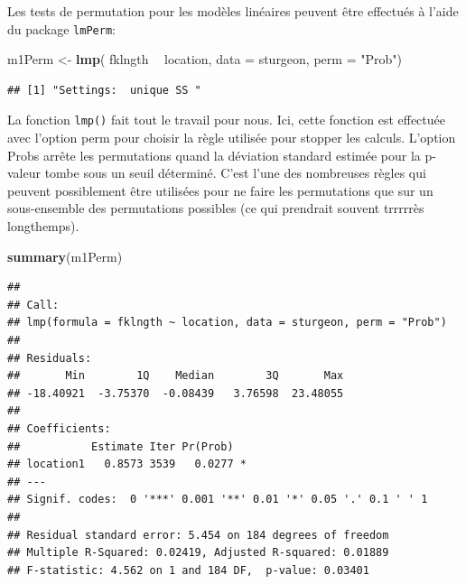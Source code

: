 \documentclass[12pt,]{book}
\newenvironment{Shaded}{\begin{snugshade}}{\end{snugshade}}
\newcommand{\DataTypeTok}[1]{\textcolor[rgb]{0.27,0.27,0.27}{#1}}
\newcommand{\KeywordTok}[1]{\textcolor[rgb]{0.27,0.27,0.27}{\textbf{#1}}}
\newcommand{\NormalTok}[1]{#1}
\newcommand{\OperatorTok}[1]{\textcolor[rgb]{0.43,0.43,0.43}{\textbf{#1}}}
\newcommand{\StringTok}[1]{\textcolor[rgb]{0.5,0.5,0.5}{#1}}
\begin{document}
Les tests de permutation pour les modèles linéaires peuvent être effectués à l'aide du package \texttt{lmPerm}:

\begin{Shaded}
\begin{Highlighting}[]
\NormalTok{m1Perm <-}\StringTok{ }\KeywordTok{lmp}\NormalTok{(}
\NormalTok{  fklngth }\OperatorTok{~}\StringTok{ }\NormalTok{location, }\DataTypeTok{data =}\NormalTok{ sturgeon,}
  \DataTypeTok{perm =} \StringTok{"Prob"}\NormalTok{)}
\end{Highlighting}
\end{Shaded}

\begin{verbatim}
## [1] "Settings:  unique SS "
\end{verbatim}

La fonction \texttt{lmp()} fait tout le travail pour nous. Ici, cette fonction est effectuée avec l'option perm pour choisir la règle utilisée pour stopper les calculs. L'option Probs arrête les permutations quand la déviation standard estimée pour la p-valeur tombe sous un seuil déterminé. C'est l'une des nombreuses règles qui peuvent possiblement être utilisées pour ne faire les permutations que sur un sous-ensemble des permutations possibles (ce qui prendrait souvent trrrrrès longthemps).

\begin{Shaded}
\begin{Highlighting}[]
\KeywordTok{summary}\NormalTok{(m1Perm)}
\end{Highlighting}
\end{Shaded}

\begin{verbatim}
## 
## Call:
## lmp(formula = fklngth ~ location, data = sturgeon, perm = "Prob")
## 
## Residuals:
##       Min        1Q    Median        3Q       Max 
## -18.40921  -3.75370  -0.08439   3.76598  23.48055 
## 
## Coefficients:
##           Estimate Iter Pr(Prob)  
## location1   0.8573 3539   0.0277 *
## ---
## Signif. codes:  0 '***' 0.001 '**' 0.01 '*' 0.05 '.' 0.1 ' ' 1
## 
## Residual standard error: 5.454 on 184 degrees of freedom
## Multiple R-Squared: 0.02419,	Adjusted R-squared: 0.01889 
## F-statistic: 4.562 on 1 and 184 DF,  p-value: 0.03401
\end{verbatim}
\end{document}
